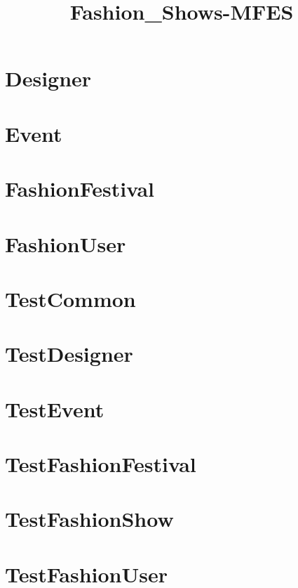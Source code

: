\documentclass{article}
\begin{document}
\title{Fashion\_Shows-MFES}
\author{}
\maketitle
\tableofcontents

\section{Designer}

\section{Event}

\section{FashionFestival}

\section{FashionUser}

\section{TestCommon}

\section{TestDesigner}

\section{TestEvent}

\section{TestFashionFestival}

\section{TestFashionShow}

\section{TestFashionUser}

\end{document}
